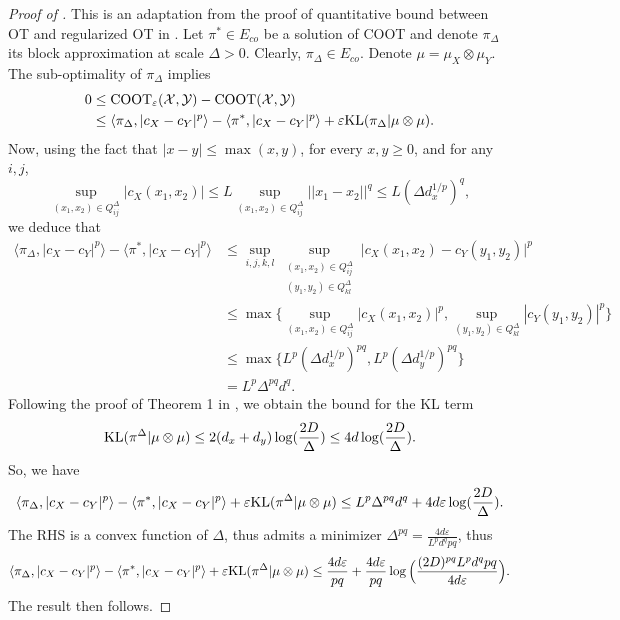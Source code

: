 \begin{proof}[Proof of ]
  This is an adaptation from the proof of quantitative bound between OT and regularized OT
  in \citep{Genevay19}.
  Let $\pi^* \in E_{co}$ be a solution of COOT and denote $\pi_{\Delta}$
  its block approximation at scale $\Delta > 0$.
  Clearly, $\pi_{\Delta} \in E_{co}$. Denote $\mu = \mu_X \otimes \mu_Y$.
  The sub-optimality of $\pi_{\Delta}$ implies
  \begin{align}
      0 &\leq \text{COOT}_{\varepsilon}(\mathcal X, \mathcal Y) - \text{COOT}(\mathcal X, \mathcal Y) \\
      &\leq \langle \pi_{\Delta}, \vert c_X - c_Y \vert^p \rangle
      - \langle \pi^*, \vert c_X - c_Y \vert^p \rangle +
      \varepsilon \text{KL}(\pi_{\Delta} \vert \mu \otimes \mu).
  \end{align}
  Now, using the fact that $\vert x - y \vert \leq \max(x,y)$, for every $x, y \geq 0$,
  and for any $i,j$,
  \begin{equation}
    \sup_{(x_1, x_2) \in Q^{\Delta}_{ij}} |c_X(x_1,x_2)|
    \leq L \sup_{(x_1, x_2) \in Q^{\Delta}_{ij}} \vert\vert x_1 - x_2 \vert\vert^q
    \leq L (\Delta d_x^{1/p})^q,
  \end{equation}
  we deduce that
  \begin{align}
    \langle \pi_{\Delta}, \vert c_X - c_Y \vert^p \rangle
    - \langle \pi^*, \vert c_X - c_Y \vert^p \rangle
    &\leq \sup_{i,j,k,l} \sup_{\substack{(x_1, x_2) \in Q^{\Delta}_{ij} \\
    (y_1,y_2) \in Q^{\Delta}_{kl}}} \vert c_X(x_1,x_2) - c_Y(y_1,y_2) \vert^p \\
    &\leq \max \big\{ \sup_{(x_1, x_2) \in Q^{\Delta}_{ij}} |c_X(x_1,x_2)|^p,
    \sup_{(y_1, y_2) \in Q^{\Delta}_{kl}} |c_Y(y_1,y_2)|^p \big\} \\
    &\leq \max \big\{ L^p (\Delta d_x^{1/p})^{pq}, L^p (\Delta d_y^{1/p})^{pq} \big\} \\
    &= L^p \Delta^{pq} d^q.
  \end{align}
  Following the proof of Theorem 1 in \citep{Genevay19}, we obtain the bound for the KL term
  \begin{equation}
      \text{KL}(\pi^{\Delta} | \mu \otimes \mu)
      \leq 2(d_x + d_y) \log(\frac{2D}{\Delta}) \leq 4 d \log(\frac{2D}{\Delta}).
  \end{equation}
  So, we have
  \begin{equation}
    \langle \pi_{\Delta}, \vert c_X - c_Y \vert^p \rangle -
    \langle \pi^*, \vert c_X - c_Y \vert^p \rangle + \varepsilon \text{KL}(\pi^{\Delta} | \mu \otimes \mu)
    \leq L^p \Delta^{pq} d^q + 4 d \varepsilon \log(\frac{2D}{\Delta}).
  \end{equation}
  The RHS is a convex function of $\Delta$, thus admits a minimizer
  $\Delta^{pq} = \frac{4d \varepsilon}{L^p d^q pq}$, thus
  \begin{equation}
    \langle \pi_{\Delta}, \vert c_X - c_Y \vert^p \rangle
    - \langle \pi^*, \vert c_X - c_Y \vert^p \rangle + \varepsilon \text{KL}(\pi^{\Delta} | \mu \otimes \mu)
    \leq \frac{4 d \varepsilon}{pq}
    + \frac{4d \varepsilon}{pq} \log\Big( \frac{(2D)^{pq} L^p d^q pq}{4d \varepsilon} \Big).
  \end{equation}
  The result then follows.
\end{proof}
